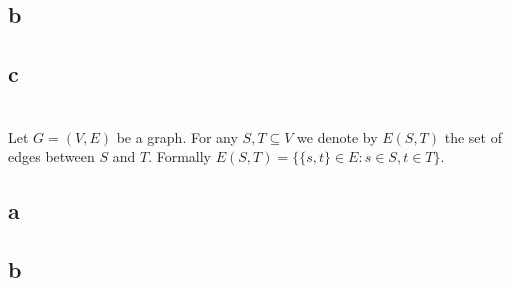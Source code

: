 \documentclass[letterpaper,12pt,oneside,onecolumn]{article}
\begin{document}
\subsection{b}
\subsection{c}
\section{}

\section{}
\paragraph{}
Let $G = (V,E)$ be a graph. For any $S, T \subseteq V$ we denote by $E(S,T)$ the set of edges between $S$ and $T$. Formally $E(S,T) = \{\{s,t\} \in E: s \in S, t \in T\}$.
\subsection{a}

\subsection{b}
\end{document}
